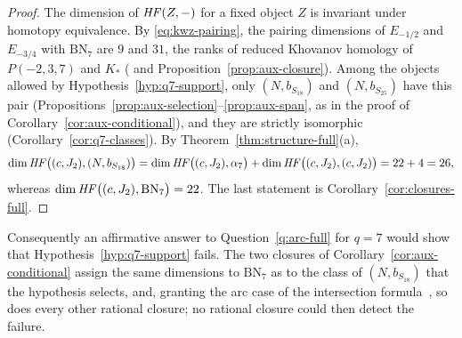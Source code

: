 \begin{proof}
The dimension of $\mathit{HF}(Z,-)$ for a fixed object $Z$ is invariant under homotopy equivalence.  By
\eqref{eq:kwz-pairing}, the pairing dimensions of $E_{-1/2}$ and $E_{-3/4}$ with $\mathrm{BN}_7$ are $9$
and $31$, the ranks of reduced Khovanov homology of $P(-2,3,7)$ and $K_*$ (\cite[\S3]{WuebbenII} and
Proposition~\ref{prop:aux-closure}).
Among the objects allowed by Hypothesis~\ref{hyp:q7-support}, only $(N,b_{S_{18}})$ and
$(N,b_{S_{25}})$ have this pair (Propositions~\ref{prop:aux-selection}--\ref{prop:aux-span}, as in the proof
of Corollary~\ref{cor:aux-conditional}), and they are strictly
isomorphic (Corollary~\ref{cor:q7-classes}).  By Theorem~\ref{thm:structure-full}(a),
\[
 \dim\mathit{HF}\bigl((c,J_2),(N,b_{S_{18}})\bigr)=\dim\mathit{HF}\bigl((c,J_2),\alpha_7\bigr)
 +\dim\mathit{HF}\bigl((c,J_2),(c,J_2)\bigr)=22+4=26,
\]
whereas $\dim\mathit{HF}\bigl((c,J_2),\mathrm{BN}_7\bigr)=22$.  The last statement is
Corollary~\ref{cor:closures-full}.
\end{proof}

Consequently an affirmative answer to Question~\ref{q:arc-full} for $q=7$ would show that
Hypothesis~\ref{hyp:q7-support} fails.  The two closures of Corollary~\ref{cor:aux-conditional} assign the
same dimensions to $\mathrm{BN}_7$ as to the class of $(N,b_{S_{18}})$ that the hypothesis selects, and,
granting the arc case of the intersection formula~\cite[Thm.~5.25]{KWZ}, so does every other rational
closure; no rational closure could then detect the failure.

